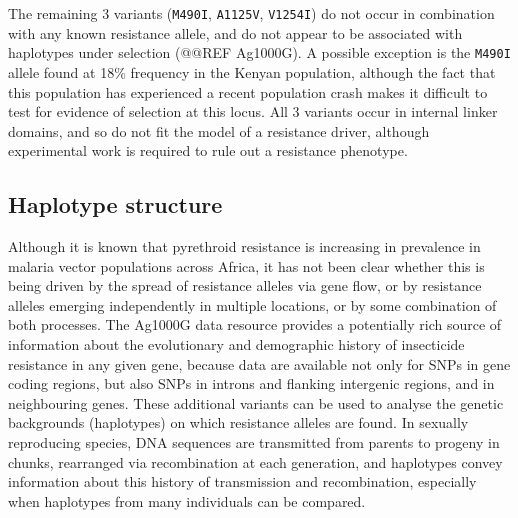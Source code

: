 \documentclass[a4paper,11pt,abstracton]{scrartcl}
\begin{document}
%
The remaining 3 variants (\texttt{M490I}, \texttt{A1125V}, \texttt{V1254I}) do not occur in combination with any known resistance allele, and do not appear to be associated with haplotypes under selection (@@REF Ag1000G).
%
A possible exception is the \texttt{M490I} allele found at 18\% frequency in the Kenyan population, although the fact that this population has experienced a recent population crash makes it difficult to test for evidence of selection at this locus.
%
All 3 variants occur in internal linker domains, and so do not fit the model of a resistance driver, although experimental work is required to rule out a resistance phenotype.
%


\subsection*{Haplotype structure}


%
Although it is known that pyrethroid resistance is increasing in prevalence in malaria vector populations across Africa, it has not been clear whether this is being driven by the spread of resistance alleles via gene flow, or by resistance alleles emerging independently in multiple locations, or by some combination of both processes.
%
The Ag1000G data resource provides a potentially rich source of information about the evolutionary and demographic history of insecticide resistance in any given gene, because data are available not only for SNPs in gene coding regions, but also SNPs in introns and flanking intergenic regions, and in neighbouring genes.
%
These additional variants can be used to analyse the genetic backgrounds (haplotypes) on which resistance alleles are found.
%
In sexually reproducing species, DNA sequences are transmitted from parents to progeny in chunks, rearranged via recombination at each generation, and haplotypes convey information about this history of transmission and recombination, especially when haplotypes from many individuals can be compared.
%
\end{document}
